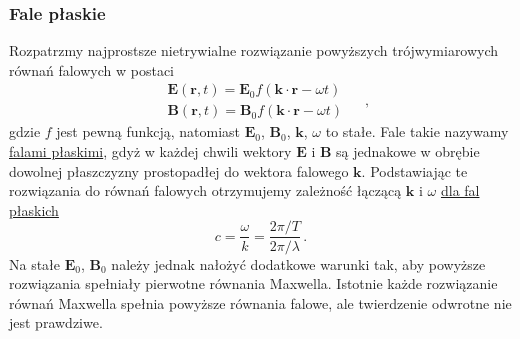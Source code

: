 \documentclass[../main.tex]{subfiles}
\begin{document}
\subsubsection{Fale płaskie}
Rozpatrzmy najprostsze nietrywialne rozwiązanie powyższych trójwymiarowych równań falowych w postaci
\begin{equation*}
\begin{split}
    &\mathbf{E}(\mathbf{r},t)=\mathbf{E}_0f(\mathbf{k}\cdot\mathbf{r}-\omega t)\\
    &\mathbf{B}(\mathbf{r},t)=\mathbf{B}_0f(\mathbf{k}\cdot\mathbf{r}-\omega t)
\end{split}\quad\,,
\end{equation*}
gdzie \(f\) jest pewną funkcją, natomiast \(\mathbf{E}_0\), \(\mathbf{B}_0\), \(\mathbf{k}\), \(\omega\) to stałe. Fale takie nazywamy \underline{falami płaskimi}, gdyż w każdej chwili wektory \(\mathbf{E}\) i \(\mathbf{B}\) są jednakowe w obrębie dowolnej płaszczyzny prostopadłej do wektora falowego \(\mathbf{k}\). Podstawiając te rozwiązania do równań falowych otrzymujemy zależność łączącą \(\mathbf{k}\) i \(\omega\) \underline{dla fal płaskich}
\begin{equation*}
    c=\frac{\omega}{k}=\frac{2\pi/T}{2\pi/\lambda}\,.
\end{equation*}
Na stałe \(\mathbf{E}_0\), \(\mathbf{B}_0\) należy jednak nałożyć dodatkowe warunki tak, aby powyższe rozwiązania spełniały pierwotne równania Maxwella. Istotnie każde rozwiązanie równań Maxwella spełnia powyższe równania falowe, ale twierdzenie odwrotne nie jest prawdziwe.
\medskip
\end{document}
